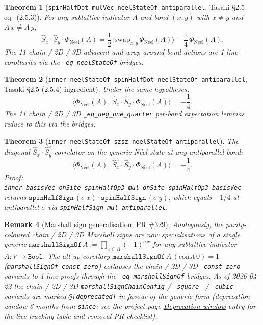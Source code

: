 \documentclass[a4paper,11pt]{article}
\newtheorem{theorem}{Theorem}
\newtheorem{remark}[theorem]{Remark}
\begin{document}
\begin{theorem}[\texttt{spinHalfDot\_mulVec\_neelStateOf\_antiparallel},
Tasaki §2.5 eq.~(2.5.3)]
For any sublattice indicator $A$ and bond $(x, y)$ with $x \ne y$
and $A\,x \ne A\,y$,
\[
  \hat S_x \cdot \hat S_y \cdot \Phi_{\mathrm{N\acute eel}}(A)
    = \frac{1}{2}\,|\mathrm{swap}_{x,y}\,\Phi_{\mathrm{N\acute eel}}(A)\rangle
      - \frac{1}{4}\,\Phi_{\mathrm{N\acute eel}}(A).
\]
The 11 chain / 2D / 3D adjacent and wrap-around bond actions are
1-line corollaries via the \texttt{\_eq\_neelStateOf} bridges.
\end{theorem}

\begin{theorem}[\texttt{inner\_neelStateOf\_spinHalfDot\_neelStateOf\_antiparallel},
Tasaki §2.5 (2.5.4) ingredient]
Under the same hypotheses,
\[
  \langle \Phi_{\mathrm{N\acute eel}}(A),\,
      \hat S_x \cdot \hat S_y \cdot \Phi_{\mathrm{N\acute eel}}(A) \rangle
    = -\frac{1}{4}.
\]
The 11 chain / 2D / 3D \texttt{\_eq\_neg\_one\_quarter} per-bond
expectation lemmas reduce to this via the bridges.
\end{theorem}

\begin{theorem}[\texttt{inner\_neelStateOf\_szsz\_neelStateOf\_antiparallel}]
The diagonal $\hat S^z_x \cdot \hat S^z_y$ correlator on the
generic Néel state at any antiparallel bond:
\[
  \langle \Phi_{\mathrm{N\acute eel}}(A),\,
      \hat S^z_x \cdot \hat S^z_y \cdot \Phi_{\mathrm{N\acute eel}}(A) \rangle
    = -\frac{1}{4}.
\]
Proof: \texttt{inner\_basisVec\_onSite\_spinHalfOp3\_mul\_onSite\_spinHalfOp3\_basisVec}
returns $\texttt{spinHalfSign}\,(\sigma\,x)\cdot\texttt{spinHalfSign}\,(\sigma\,y)$,
which equals $-1/4$ at antiparallel $\sigma$ via
\texttt{spinHalfSign\_mul\_antiparallel}.
\end{theorem}

\begin{remark}[Marshall sign generalisation, PR \#329]
Analogously, the parity-coloured chain / 2D / 3D Marshall signs
are now specialisations of a single generic $\texttt{marshallSignOf}\,A
:= \prod_{x \in A} (-1)^{\sigma\,x}$ for any sublattice indicator
$A : V \to \texttt{Bool}$.  The all-up corollary
$\texttt{marshallSignOf}\,A\,(\mathrm{const}\,0) = 1$
(\texttt{marshallSignOf\_const\_zero}) collapses the chain / 2D / 3D
\texttt{\_const\_zero} variants to 1-line proofs through the
\texttt{\_eq\_marshallSignOf} bridges.  As of 2026-04-22 the chain
/ 2D / 3D \texttt{marshallSignChainConfig} / \texttt{\_square\_} /
\texttt{\_cubic\_} variants are marked
\texttt{@[deprecated]} in favour of the generic form (deprecation
window 6 months from \texttt{since}; see the project page
\href{https://phasetr.github.io/lattice-system/deprecations/}%
{\textsl{Deprecation window}} entry for the live tracking table
and removal-PR checklist).
\end{remark}
\end{document}

